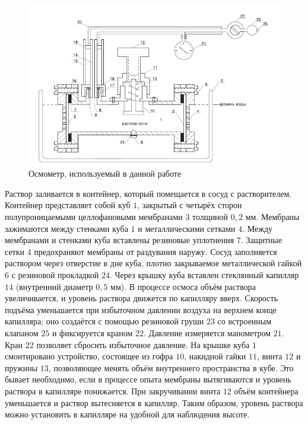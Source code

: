 \documentclass[a4paper, 12pt]{article}
\begin{document}
    \begin{figure}[H]
        \centering
        \includegraphics[scale = 0.5]{images/installation.png}
        \caption{Осмометр, используемый в данной работе}
        \label{installation}
    \end{figure}
    
    \noindent Раствор заливается в контейнер, который помещается в сосуд с растворителем. Контейнер представляет собой куб $1$, закрытый с четырёх сторон полупроницаемыми целлофановыми мембранами $3$ толщиной $0,2$ мм. Мембраны зажимаются между стенками куба $1$ и металлическими сетками $4$. Между мембранами и стенками куба вставлены резиновые уплотнения $7$. Защитные сетки $4$ предохраняют мембраны от раздувания наружу. Сосуд заполняется раствором через отверстие в дне куба, плотно закрываемое металлической гайкой $6$ с резиновой прокладкой $24$. Через крышку куба вставлен стеклянный капилляр $14$ (внутренний диаметр $0,5$ мм). В процессе осмоса объём раствора увеличивается, и уровень раствора движется по капилляру вверх. Скорость подъёма уменьшается при избыточном давлении воздуха на верхнем конце капилляра; оно создаётся с помощью резиновой груши $23$ со встроенным клапаном $25$ и фиксируется краном $22$. Давление измеряется манометром $21$. Кран $22$ позволяет сбросить избыточное давление. На крышке куба $1$ смонтировано устройство, состоящее из гофра $10$, накидной гайки $11$, винта $12$ и пружины $13$, позволяющее менять объём внутреннего пространства в кубе. Это бывает необходимо, если в процессе опыта мембраны вытягиваются и уровень раствора в капилляре понижается. При закручивании винта $12$ объём контейнера уменьшается и раствор вытесняется в капилляр. Таким образом, уровень раствора можно установить в капилляре на удобной для наблюдения высоте. \\
    
\end{document}
